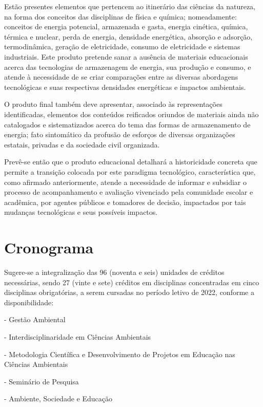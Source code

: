 \documentclass[
   article,       %
   12pt,          %
   oneside,       %
   a4paper,       %
   english,       %
   brazil,           %
   sumario=tradicional
   ]{abntex2}
\begin{document}
Estão presentes elementos que pertencem ao itinerário das ciências da natureza, na forma dos conceitos das disciplinas de física e química; nomeadamente: conceitos de energia potencial, armazenada e gasta, energia cinética, química, térmica e nuclear, perda de energia, densidade energética, absorção e adsorção, termodinâmica, geração de eletricidade, consumo de eletricidade e sistemas industriais. Este produto pretende sanar a ausência de materiais educacionais acerca das tecnologias de armazenagem de energia, sua produção e consumo, e atende à necessidade de se criar comparações entre as diversas abordagens tecnológicas e suas respectivas densidades energéticas e impactos ambientais.

O produto final também deve apresentar, associado às representações identificadas, elementos dos conteúdos reificados oriundos de materiais ainda não catalogados e sistematizados acerca do tema das formas de armazenamento de energia; fato sintomático da profusão de esforços de diversas organizações estatais, privadas e da sociedade civil organizada.

Prevê-se então que o produto educacional detalhará a historicidade concreta que permite a transição colocada por este paradigma tecnológico, característica que, como afirmado anteriormente, atende a necessidade de informar e subsidiar o processo de acompanhamento e avaliação vivenciado pela comunidade escolar e acadêmica, por agentes públicos e tomadores de decisão, impactados por tais mudanças tecnológicas e seus possíveis impactos.



\section{Cronograma}

Sugere-se a integralização das 96 (noventa e seis) unidades de créditos necessárias, sendo 27 (vinte e sete) créditos em disciplinas concentradas em cinco disciplinas obrigatórias, a serem cursadas no período letivo de 2022, conforme a disponibilidade: 



\begin{description}[font=$\bullet$~\normalfont\scshape]
\item [DCI4002] - Gestão Ambiental
\item [DCI4003] - Interdisciplinaridade em Ciências Ambientais
\item [DCI4004] - Metodologia Científica e Desenvolvimento de Projetos em Educação nas Ciências Ambientais
\item [DCI4005] - Seminário de Pesquisa
\item [DCI4006] - Ambiente, Sociedade e Educação
\end{description}
\end{document}
